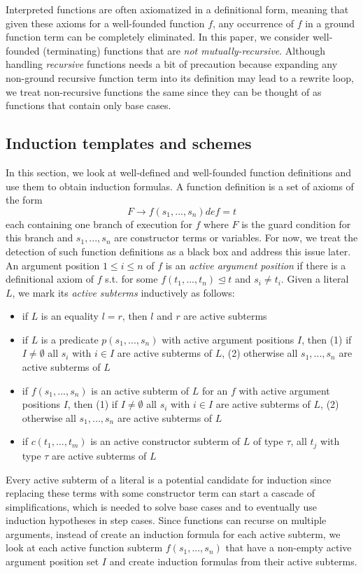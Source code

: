 
Interpreted functions are often axiomatized in a definitional form, meaning that given these axioms for a well-founded function $f$, any occurrence of $f$ in a ground function term can be completely eliminated. In this paper, we consider well-founded (terminating) functions that are \textit{not mutually-recursive}. Although handling \textit{recursive} functions needs a bit of precaution because expanding any non-ground recursive function term into its definition may lead to a rewrite loop, we treat non-recursive functions the same since they can be thought of as functions that contain only base cases.
\subsection{Induction templates and schemes}
In this section, we look at well-defined and well-founded function definitions and use them to obtain induction formulas. A function definition is a set of axioms of the form
$$F\rightarrow f(s_1,...,s_n)def=t$$
each containing one branch of execution for $f$ where $F$ is the guard condition for this branch and $s_1,...,s_n$ are constructor terms or variables. For now, we treat the detection of such function definitions as a black box and address this issue later. An argument position $1\le i\le n$ of $f$ is an \textit{active argument position} if there is a definitional axiom of $f$ s.t. for some $f(t_1,...,t_n)\trianglelefteq t$ and $s_i\neq t_i$. Given a literal $L$, we mark its \textit{active subterms} inductively as follows:
\begin{itemize}
	\item if $L$ is an equality $l=r$, then $l$ and $r$ are active subterms
	\item if $L$ is a predicate $p(s_1,...,s_n)$ with active argument positions $I$, then (1) if $I\neq\emptyset$ all $s_i$ with $i\in I$ are active subterms of $L$, (2) otherwise all $s_1,...,s_n$ are active subterms of $L$
	\item if $f(s_1,...,s_n)$ is an active subterm of $L$ for an $f$ with active argument positions $I$, then (1) if $I\neq\emptyset$ all $s_i$ with $i\in I$ are active subterms of $L$, (2) otherwise all $s_1,...,s_n$ are active subterms of $L$
	\item if $c(t_1,...,t_m)$ is an active constructor subterm of $L$ of type $\tau$, all $t_j$ with type $\tau$ are active subterms of $L$
\end{itemize}
Every active subterm of a literal is a potential candidate for induction since replacing these terms with some constructor term can start a cascade of simplifications, which is needed to solve base cases and to eventually use induction hypotheses in step cases. Since functions can recurse on multiple arguments, instead of create an induction formula for each active subterm, we look at each active function subterm $f(s_1,...,s_n)$ that have a non-empty active argument position set $I$ and create induction formulas from their active subterms.

